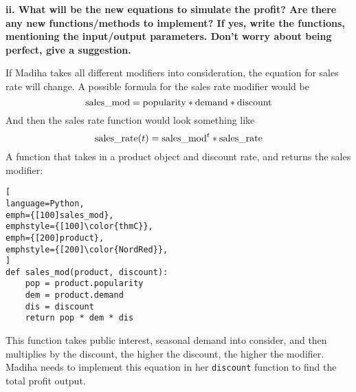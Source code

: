 \documentclass[article, 12pt, a4paper]{memoir}
\begin{document}
\textbf{ii. What will be the new equations to simulate the profit? Are there any new
functions/methods to implement? If yes, write the functions, mentioning the input/output
parameters. Don’t worry about being perfect, give a suggestion.}
\vspace{1em}

\begin{solution}
    [c.ii]
    If Madiha takes all different modifiers into consideration, the equation for sales
    rate will change. A possible formula for the sales rate modifier would be
    \[\text{sales\textunderscore mod} = \text{popularity} * \text{demand} *
    \text{discount}\]      
    And then the sales rate function would look something like
    \[\text{sales\textunderscore rate}(t) = \text{sales\textunderscore mod}^t *
    \text{sales\textunderscore rate}\] 
    A function that takes in a product object and discount rate, and returns the sales
    modifier:
\begin{lstlisting}[
language=Python,
emph={[100]sales_mod},
emphstyle={[100]\color{thmC}},
emph={[200]product},
emphstyle={[200]\color{NordRed}},
]
def sales_mod(product, discount):
    pop = product.popularity
    dem = product.demand
    dis = discount
    return pop * dem * dis
\end{lstlisting}
    This function takes public interest, seasonal demand into consider, and then
    multiplies by the discount, the higher the discount, the higher the modifier.\\

    Madiha needs to implement this equation in her \texttt{discount} function to find the
    total profit output. 
\end{solution}
\end{document}
